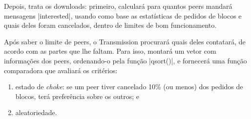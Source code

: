 
Depois, trata os downloads: primeiro, calculará para quantos \glspl*{peer} mandará
mensagens \bverb|interested|, usando como base as estatísticas de pedidos de blocos e
quais deles foram cancelados, dentro de limites de bom funcionamento.


Após saber o limite de \glspl*{peer}, o Transmission procurará quais deles contatará, de
acordo com as partes que lhe faltam. Para isso, montará um vetor com informações dos
\glspl*{peer}, ordenando-o pela função \sverb|qsort()|, e fornecerá uma função
comparadora que avaliará os critérios:

\begin{enumerate}
    \item estado de \emph{choke}: se um \gls*{peer} tiver cancelado 10\% (ou menos) dos
        pedidos de blocos, terá preferência sobre os outros; e
    \item aleatoriedade.
\end{enumerate}



